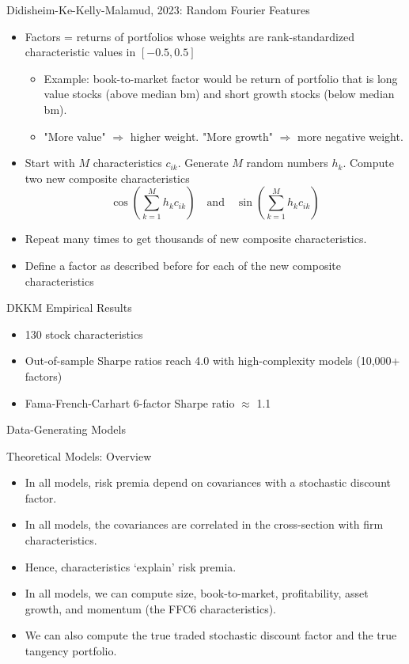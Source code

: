 \documentclass[aspectratio=169]{beamer}
\begin{document}
\begin{frame}{Didisheim-Ke-Kelly-Malamud, 2023:  Random Fourier Features}

\begin{itemize}
  \item Factors = returns of portfolios whose weights are rank-standardized characteristic values in $[-0.5, 0.5]$
 \begin{itemize}
  \item Example: book-to-market factor would be return of portfolio that is long value stocks (above median bm) and short growth stocks (below median bm).
  \item "More value" $\Rightarrow$ higher weight.  "More growth" $\Rightarrow$ more negative weight.
  \end{itemize}
  \pause
  \item Start with $M$ characteristics $c_{ik}$.  Generate $M$ random numbers $h_k$.  Compute two new composite characteristics
$$\cos\left(\sum_{k=1}^M h_kc_{ik}\right) \quad \text{and} \quad \sin\left(\sum_{k=1}^M h_kc_{ik}\right)$$
\pause
  \item Repeat many times to get thousands of new composite characteristics.
  \item Define a factor as described before for each of the new composite characteristics
\end{itemize}
\end{frame}

\begin{frame}{DKKM Empirical Results}
\begin{itemize}
  \item 130 stock characteristics
  \item Out-of-sample Sharpe ratios reach 4.0 with high-complexity models (10,000+ factors)
   \item Fama-French-Carhart 6-factor Sharpe ratio $\approx$ 1.1
 \end{itemize}
\end{frame}

\begin{frame}[c]
  \centering
  \Huge Data-Generating Models
\end{frame}

\begin{frame}{Theoretical Models: Overview}
\begin{itemize}
\item In all models, risk premia depend on covariances with a stochastic discount factor.
\item In all models, the covariances are correlated in the cross-section with firm characteristics.
\item Hence, characteristics `explain' risk premia.
\item In all models, we can compute size, book-to-market, profitability, asset growth, and momentum (the FFC6 characteristics).
\item We can also compute the true traded stochastic discount factor and the true tangency portfolio.
\end{itemize}
\end{frame}
\end{document}
